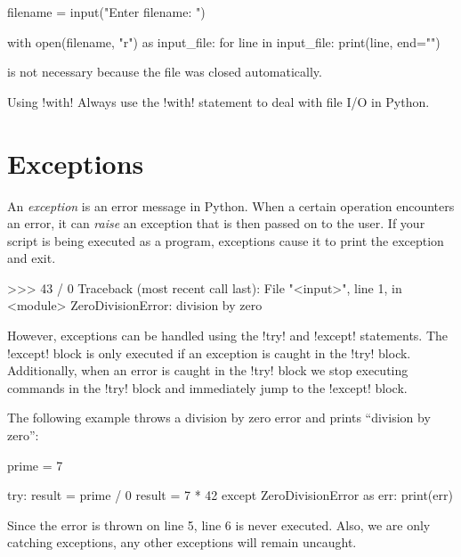 \documentclass[11pt]{cselabheader}
\begin{document}
\begin{python3code}
filename = input("Enter filename: ")

with open(filename, "r") as input_file:
    for line in input_file:
        print(line, end="")
\end{python3code}

 is not necessary because the file was closed
automatically.

\begin{warningbox}{Using \protect\pythoninline!with!}
  Always use the \pythoninline!with! statement to deal with file I/O in Python.
\end{warningbox}

\pagebreak
\section{Exceptions}

An \emph{exception} is an error message in Python. When a certain operation
encounters an error, it can \emph{raise} an exception that is then passed on to
the user. If your script is being executed as a program, exceptions cause it to
print the exception and exit.

\begin{pyconcode}
>>> 43 / 0
Traceback (most recent call last):
  File "<input>", line 1, in <module>
ZeroDivisionError: division by zero
\end{pyconcode}

However, exceptions can be handled using the \pythoninline!try!
and \pythoninline!except! statements.
The \pythoninline!except! block is only executed if an exception is caught in
the \pythoninline!try! block. Additionally, when an error is caught in the
\pythoninline!try! block we stop executing commands in the \pythoninline!try!
block and immediately jump to the \pythoninline!except! block.

The following example throws a division by zero error and prints ``division by
zero'':

\begin{python3code}
prime = 7

try:
    result = prime / 0
    result = 7 * 42
except ZeroDivisionError as err:
    print(err)
\end{python3code}

Since the error is thrown on line 5, line 6 is never executed. Also, we are
only catching  exceptions, any other exceptions
will remain uncaught.
\end{document}

